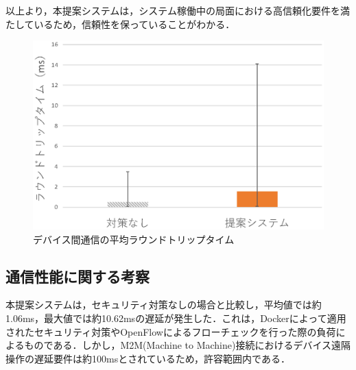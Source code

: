 \documentclass[a4paper,10pt,twocolumn,uplatex]{jsarticle}
\begin{document}
以上より，本提案システムは，システム稼働中の局面における高信頼化要件を満たしているため，信頼性を保っていることがわかる．

\begin{figure}[!tb]
  \centering
  \includegraphics[width=\linewidth]{img/result.eps}
  \caption{デバイス間通信の平均ラウンドトリップタイム}
  \label{fig:result2}
\end{figure}

\subsection{通信性能に関する考察}
本提案システムは，セキュリティ対策なしの場合と比較し，平均値では約1.06ms，最大値では約10.62msの遅延が発生した．これは，Dockerによって適用されたセキュリティ対策やOpenFlowによるフローチェックを行った際の負荷によるものである．しかし，M2M(Machine to Machine)接続におけるデバイス遠隔操作の遅延要件は約100msとされている\cite{latency}ため，許容範囲内である．

\end{document}
